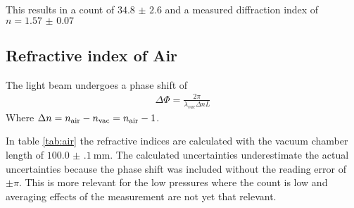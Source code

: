 This results in a count of $\num{34.8(26)}$ and a measured diffraction index of
$n = \num{1.57(7)}$

\subsection{Refractive index of Air}
The light beam undergoes a phase shift of
\begin{align}
	\Delta\Phi = \frac{2 \pi}{\lambda_{vac} \Delta n L }
\end{align}
Where $\Delta n = n_\text{air}- n_\text{vac} = n_\text{air}-1 $.

In table \eqref{tab:air} the refractive indices are calculated with the vacuum
chamber length of $\qty{100.0(1)}{\mm}$. The calculated uncertainties
underestimate the actual uncertainties because the phase shift was included
without the reading error of $\pm \pi$. This is more relevant for the low
pressures where the count is low and averaging effects of the measurement are
not yet that relevant.

